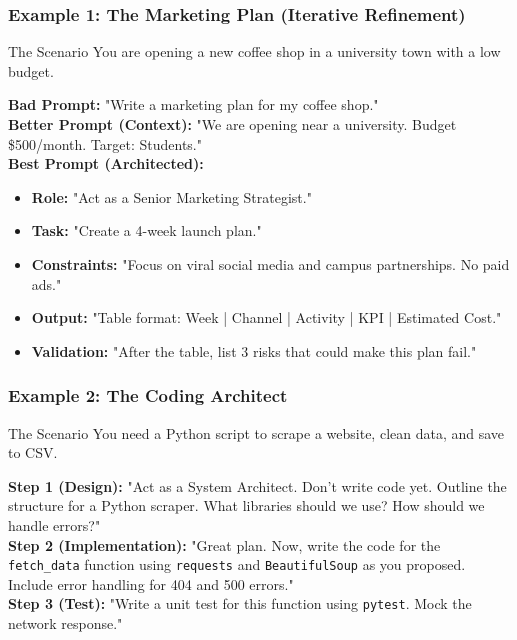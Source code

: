 \documentclass{beamer}
\begin{document}
\begin{frame}
    \frametitle{Example 1: The Marketing Plan (Iterative Refinement)}
    \begin{block}{The Scenario}
        You are opening a new coffee shop in a university town with a low budget.
    \end{block}
    \textbf{Bad Prompt:} "Write a marketing plan for my coffee shop." \\
    \vspace{0.3cm}
    \textbf{Better Prompt (Context):} "We are opening near a university. Budget \$500/month. Target: Students." \\
    \vspace{0.3cm}
    \textbf{Best Prompt (Architected):}
    \begin{itemize}
        \item \textbf{Role:} "Act as a Senior Marketing Strategist."
        \item \textbf{Task:} "Create a 4-week launch plan."
        \item \textbf{Constraints:} "Focus on viral social media and campus partnerships. No paid ads."
        \item \textbf{Output:} "Table format: Week | Channel | Activity | KPI | Estimated Cost."
        \item \textbf{Validation:} "After the table, list 3 risks that could make this plan fail."
    \end{itemize}
\end{frame}

\begin{frame}
    \frametitle{Example 2: The Coding Architect}
    \begin{block}{The Scenario}
        You need a Python script to scrape a website, clean data, and save to CSV.
    \end{block}
    \textbf{Step 1 (Design):} "Act as a System Architect. Don't write code yet. Outline the structure for a Python scraper. What libraries should we use? How should we handle errors?" \\
    \vspace{0.3cm}
    \textbf{Step 2 (Implementation):} "Great plan. Now, write the code for the \texttt{fetch\_data} function using \texttt{requests} and \texttt{BeautifulSoup} as you proposed. Include error handling for 404 and 500 errors." \\
    \vspace{0.3cm}
    \textbf{Step 3 (Test):} "Write a unit test for this function using \texttt{pytest}. Mock the network response."
\end{frame}
\end{document}
